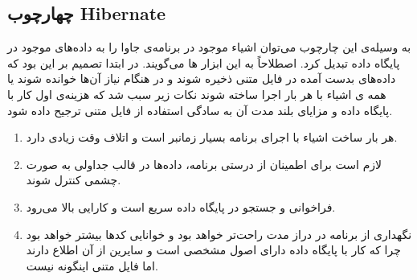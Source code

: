 \subsection{چهارچوب Hibernate }
به وسیله‌ی این چارچوب می‌توان  اشیاء موجود در برنامه‌ی جاوا را به داده‌های موجود در پایگاه داده تبدیل کرد. اصطلاحاً به این ابزار ها  می‌گویند. در ابتدا تصمیم بر این بود که داده‌های بدست آمده در فایل متنی ذخیره شوند و در هنگام نیاز آن‌ها خوانده شوند یا همه ی اشیاء با هر بار اجرا ساخته شوند نکات زیر سبب شد که هزینه‌ی اول کار با پایگاه داده و مزایای بلند مدت آن به سادگی استفاده از فایل متنی ترجیح داده شود.
\begin{enumerate}
\item	

هر بار ساخت اشیاء با اجرای برنامه بسیار زمانبر است و اتلاف وقت زیادی دارد.
\item
 لازم است برای اطمینان از درستی برنامه، داده‌ها در قالب جداولی به صورت چشمی کنترل شوند.
\item
 فراخوانی و جستجو در پایگاه داده سریع است و کارایی بالا می‌رود.
\item
نگهداری از برنامه در دراز مدت راحت‌تر خواهد بود و خوانایی کدها بیشتر خواهد بود چرا که کار با پایگاه داده دارای اصول مشخصی است و سایرین از آن اطلاع دارند اما فایل متنی اینگونه نیست.
\end{enumerate}